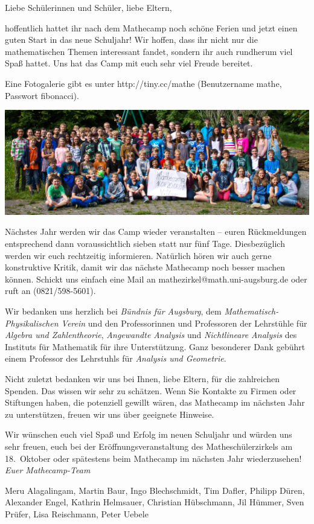 \documentclass[12pt]{zettel}
\begin{document}
\renewcommand{\betreff}{Mathecamp -- schön war's!}

\makeletterhead{}
\vspace{-2em}

Liebe Schülerinnen und Schüler, liebe Eltern,

hoffentlich hattet ihr nach dem Mathecamp noch schöne Ferien und jetzt einen
guten Start in das neue Schuljahr! Wir hoffen, dass ihr nicht nur die
mathematischen Themen interessant fandet, sondern ihr auch rundherum viel
Spaß hattet. Uns hat das Camp mit euch sehr viel Freude bereitet.

Eine Fotogalerie gibt es unter \textsf{http:/\!/tiny.cc/mathe}
(Benutzername \textsf{mathe}, Passwort \textsf{fibonacci}).

\begin{center}
  \includegraphics[scale=1.2]{gruppenfoto-ausschnitt}
\end{center}

Nächstes Jahr werden wir das Camp wieder veranstalten -- euren Rückmeldungen
entsprechend dann voraussichtlich sieben statt nur fünf Tage. Diesbezüglich
werden wir euch rechtzeitig informieren. Natürlich hören wir auch gerne
konstruktive Kritik, damit wir das nächste Mathecamp noch besser
machen können. Schickt uns einfach eine Mail an
\textsf{mathezirkel@math.uni-augsburg.de} oder ruft an (0821/598-5601).

Wir bedanken uns herzlich bei \emph{Bündnis für Augsburg}, dem
\emph{Mathematisch-Physikalischen Verein} und den Professorinnen und
Professoren der Lehrstühle für \emph{Algebra und Zahlentheorie},
\emph{Angewandte Analysis} und \emph{Nichtlineare Analysis} des Instituts für
Mathematik für ihre Unterstützung.
Ganz besonderer Dank gebührt einem Professor des
Lehrstuhls für \emph{Analysis und Geometrie}.

Nicht zuletzt bedanken wir uns bei Ihnen, liebe Eltern, für die zahlreichen
Spenden. Das wissen wir sehr zu schätzen.
Wenn Sie Kontakte zu Firmen oder Stiftungen haben, die potenziell gewillt
wären, das Mathecamp im nächsten Jahr zu unterstützen, freuen wir uns über
geeignete Hinweise.

Wir wünschen euch viel Spaß und Erfolg im neuen Schuljahr und würden uns
sehr freuen, euch bei der Eröffnungsveranstaltung des Matheschülerzirkels am
18.~Oktober oder spätestens beim Mathecamp im nächsten Jahr wiederzusehen!
\emph{Euer Mathecamp-Team}

{\small Meru Alagalingam, Martin Baur, Ingo Blechschmidt, Tim Dafler, Philipp Düren,
Alexander Engel, Kathrin Helmsauer,
Christian Hübschmann, Jil Hümmer, Sven Prüfer,
Lisa Reischmann, Peter Uebele}
\end{document}
